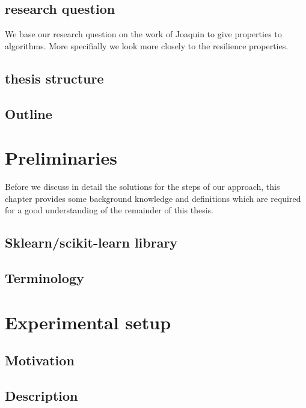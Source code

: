 \documentclass[a4paper,10pt]{article}
\begin{document}
\subsection{research question}
We base our research question on the work of Joaquin to give properties to algorithms. More specifially we look more closely to the resilience properties. 

\subsection{thesis structure}

\subsection{Outline}

\newpage


\section{Preliminaries} \label{Chapter2}
Before we discuss in detail the solutions for the steps of our approach, this chapter provides
some background knowledge and definitions which are required for a good understanding of
the remainder of this thesis.
\subsection{Sklearn/scikit-learn library}

\subsection{Terminology}

\newpage
\section{Experimental setup} \label{Chapter3}
\subsection{Motivation} \label{motivation}


\newpage
\subsection{Description} \label{description}
\end{document}
